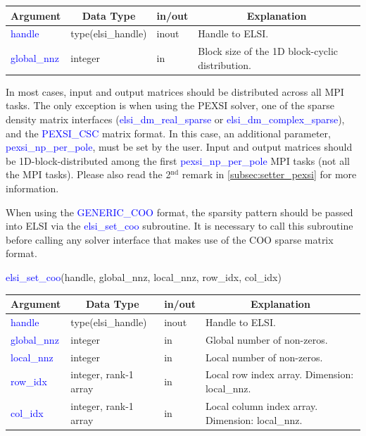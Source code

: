 \documentclass{report}
\begin{document}
\begin{tabular}[]{|p{30mm}|p{30mm}|p{15mm}|p{90mm}|}
\hline
\multicolumn{1}{|c|}{\textbf{Argument}} & \multicolumn{1}{c|}{\textbf{Data Type}} & \multicolumn{1}{c|}{\textbf{in/out}} & \multicolumn{1}{c|}{\textbf{Explanation}}\\
\hline
\textcolor{blue}{handle}       & type(elsi\_handle) & inout & Handle to ELSI.\\
\hline
\textcolor{blue}{global\_nnz}  & integer            & in    & Block size of the 1D block-cyclic distribution.\\
\hline
\end{tabular}

In most cases, input and output matrices should be distributed across all MPI tasks.  The only exception is when using the PEXSI solver, one of the sparse density matrix interfaces (\textcolor{blue}{elsi\_dm\_real\_sparse} or \textcolor{blue}{elsi\_dm\_complex\_sparse}), and the \textcolor{blue}{PEXSI\_CSC} matrix format.  In this case, an additional parameter, \textcolor{blue}{pexsi\_np\_per\_pole}, must be set by the user.  Input and output matrices should be 1D-block-distributed among the first \textcolor{blue}{pexsi\_np\_per\_pole} MPI tasks (not all the MPI tasks).  Please also read the 2$^\text{nd}$ remark in \ref{subsec:setter_pexsi} for more information.

When using the \textcolor{blue}{GENERIC\_COO} format, the sparsity pattern should be passed into ELSI via the \textcolor{blue}{elsi\_set\_coo} subroutine.  It is necessary to call this subroutine before calling any solver interface that makes use of the COO sparse matrix format.
\begin{labeling}{\hspace{6cm}}
\item [\hspace{0.3cm} \textcolor{blue}{elsi\_set\_coo}(handle, global\_nnz, local\_nnz, row\_idx, col\_idx)]
\end{labeling}

\begin{tabular}[]{|p{30mm}|p{35mm}|p{15mm}|p{85mm}|}
\hline
\multicolumn{1}{|c|}{\textbf{Argument}} & \multicolumn{1}{c|}{\textbf{Data Type}} & \multicolumn{1}{c|}{\textbf{in/out}} & \multicolumn{1}{c|}{\textbf{Explanation}}\\
\hline
\textcolor{blue}{handle}      & type(elsi\_handle)    & inout & Handle to ELSI.\\
\hline
\textcolor{blue}{global\_nnz} & integer               & in    & Global number of non-zeros.\\
\hline
\textcolor{blue}{local\_nnz}  & integer               & in    & Local number of non-zeros.\\
\hline
\textcolor{blue}{row\_idx}    & integer, rank-1 array & in    & Local row index array.  Dimension: local\_nnz.\\
\hline
\textcolor{blue}{col\_idx}    & integer, rank-1 array & in    & Local column index array.  Dimension: local\_nnz.\\
\hline
\end{tabular}
\end{document}
